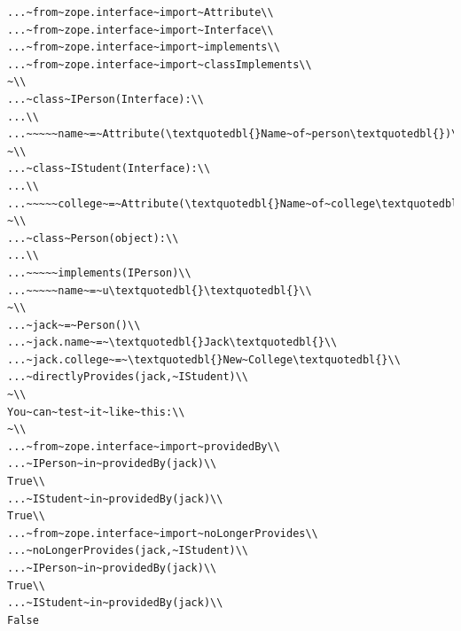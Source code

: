 \documentclass[a4paper,openany,twoside,draft]{book}
\begin{document}
\begin{verbatim}
...~from~zope.interface~import~Attribute\\
...~from~zope.interface~import~Interface\\
...~from~zope.interface~import~implements\\
...~from~zope.interface~import~classImplements\\
~\\
...~class~IPerson(Interface):\\
...\\
...~~~~~name~=~Attribute(\textquotedbl{}Name~of~person\textquotedbl{})\\
~\\
...~class~IStudent(Interface):\\
...\\
...~~~~~college~=~Attribute(\textquotedbl{}Name~of~college\textquotedbl{})\\
~\\
...~class~Person(object):\\
...\\
...~~~~~implements(IPerson)\\
...~~~~~name~=~u\textquotedbl{}\textquotedbl{}\\
~\\
...~jack~=~Person()\\
...~jack.name~=~\textquotedbl{}Jack\textquotedbl{}\\
...~jack.college~=~\textquotedbl{}New~College\textquotedbl{}\\
...~directlyProvides(jack,~IStudent)\\
~\\
You~can~test~it~like~this:\\
~\\
...~from~zope.interface~import~providedBy\\
...~IPerson~in~providedBy(jack)\\
True\\
...~IStudent~in~providedBy(jack)\\
True\\
...~from~zope.interface~import~noLongerProvides\\
...~noLongerProvides(jack,~IStudent)\\
...~IPerson~in~providedBy(jack)\\
True\\
...~IStudent~in~providedBy(jack)\\
False
\end{verbatim}
\end{document}
